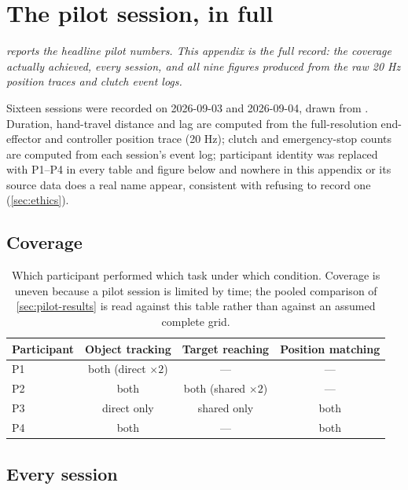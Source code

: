 \chapter{The pilot session, in full}
\label{app:pilot}

\noindent\emph{ reports the headline pilot numbers.
This appendix is the full record: the coverage actually achieved, every
session, and all nine figures produced from the raw 20 Hz position traces and
clutch event logs.}

Sixteen sessions were recorded on 2026-09-03 and 2026-09-04, drawn from
. Duration, hand-travel distance and lag are
computed from the full-resolution end-effector and controller position trace
(20 Hz); clutch and emergency-stop counts are computed from each session's
event log; participant identity was replaced with P1--P4 in every table and
figure below and nowhere in this appendix or its source data does a real name
appear, consistent with  refusing to record one
(\cref{sec:ethics}).

\section{Coverage}

\begin{table}[htbp]
  \centering
  \small
  \caption[Pilot coverage]{Which participant performed which task under which
  condition. Coverage is uneven because a pilot session is limited by time; the
  pooled comparison of \cref{sec:pilot-results} is read against this table
  rather than against an assumed complete grid.}
  \label{tab:pilot-coverage}
  \begin{tabular}{@{}lccc@{}}
    \toprule
    Participant & Object tracking & Target reaching & Position matching \\
    \midrule
    P1 & both (direct $\times2$) & --- & --- \\
    P2 & both & both (shared $\times2$) & --- \\
    P3 & direct only & shared only & both \\
    P4 & both & --- & both \\
    \bottomrule
  \end{tabular}
\end{table}

\section{Every session}

